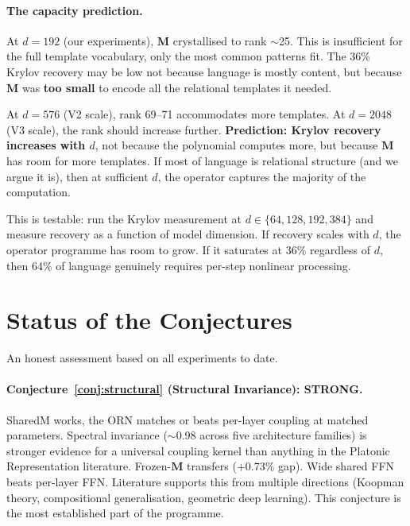 \documentclass[11pt, a4paper]{article}
\newcommand{\M}{\mathbf{M}}
\theoremstyle{plain}
\theoremstyle{definition}
\theoremstyle{remark}
\begin{document}
\paragraph{The capacity prediction.}
At $d = 192$ (our experiments), $\M$ crystallised to rank $\sim$25.
This is insufficient for the full template vocabulary, only the most common patterns fit.
The 36\% Krylov recovery may be low not because language is mostly content, but because $\M$ was \textbf{too small} to encode all the relational templates it needed.

At $d = 576$ (V2 scale), rank 69--71 accommodates more templates.
At $d = 2048$ (V3 scale), the rank should increase further.
\textbf{Prediction: Krylov recovery increases with $d$}, not because the polynomial computes more, but because $\M$ has room for more templates.
If most of language is relational structure (and we argue it is), then at sufficient $d$, the operator captures the majority of the computation.

This is testable: run the Krylov measurement at $d \in \{64, 128, 192, 384\}$ and measure recovery as a function of model dimension.
If recovery scales with $d$, the operator programme has room to grow.
If it saturates at 36\% regardless of $d$, then 64\% of language genuinely requires per-step nonlinear processing.


\section{Status of the Conjectures}

An honest assessment based on all experiments to date.

\paragraph{Conjecture~\ref{conj:structural} (Structural Invariance): STRONG.}
SharedM works, the ORN matches or beats per-layer coupling at matched parameters.
Spectral invariance ($\sim$0.98 across five architecture families) is stronger evidence for a universal coupling kernel than anything in the Platonic Representation literature.
Frozen-$\M$ transfers ($+0.73\%$ gap).
Wide shared FFN beats per-layer FFN.
Literature supports this from multiple directions (Koopman theory, compositional generalisation, geometric deep learning).
This conjecture is the most established part of the programme.
\end{document}
